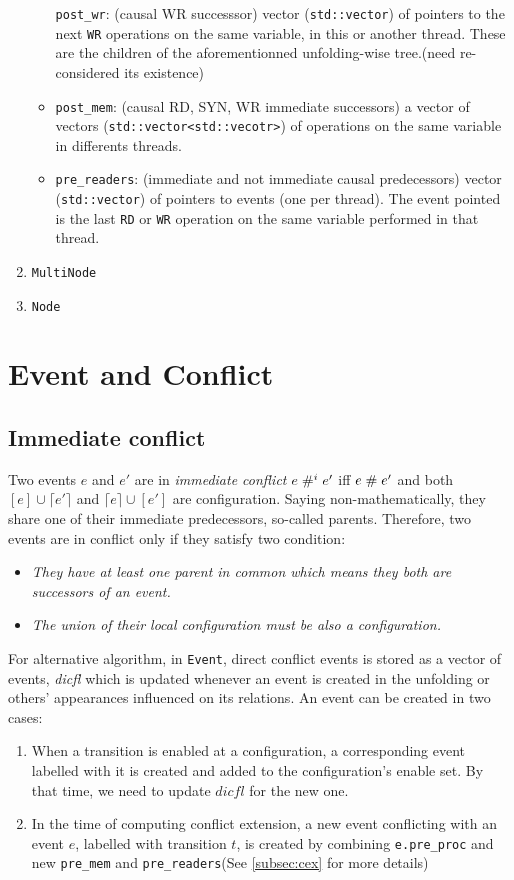 \documentclass{llncs}
\begin{document}
\begin{enumerate}
\begin{itemize}
  \verb!post_wr!: (causal WR successsor) vector (\verb!std::vector!) of
  pointers to the next \verb!WR! operations on the same variable, in this
  or another thread. These are the children of the aforementionned
  unfolding-wise tree.(need re-considered its existence)
\item
  \verb!post_mem!: (causal RD, SYN, WR immediate successors) a vector of vectors (\verb!std::vector<std::vecotr>!) of operations on the same variable in differents threads. 
	
\item
  \verb!pre_readers!: (immediate and not immediate causal predecessors)
  vector (\verb!std::vector!) of pointers to events (one per thread).
  The event pointed is the last \verb!RD! or \verb!WR! operation on the
  same variable performed in that thread.
\end{itemize}

\item
	\verb!MultiNode!
\item
	\verb!Node!

\end{enumerate}

\section{Event and Conflict}
\subsection{Immediate conflict}
Two events $e$ and $e'$ are in \textit{immediate conflict} $e \mathrel{\#^i_{}} e' $ iff $e \mathrel{\#} e'$ and both $[e] \cup \lceil e' \rceil$ and $ \lceil e \rceil \cup [e']$ are configuration. Saying non-mathematically, they share one of their immediate predecessors, so-called parents.
Therefore, two events are in conflict only if they satisfy two condition:
\begin{itemize}
\item
	\textit{They have at least one parent in common which means they both are successors of an event.}
\item
	\textit{The union of their local configuration must be also a configuration.}
\end{itemize}

For alternative algorithm, in \verb!Event!, direct conflict events is stored as a vector of events, \textit{dicfl} which is updated whenever an event is created in the unfolding or others' appearances influenced on its relations.
An event can be created in two cases:
\begin{enumerate}
\item
	When a transition is enabled at a configuration, a corresponding event labelled with it is
	created and added to the configuration's enable set. By that time, we need to update $dicfl$ for 
	the new one.
\item
	In the time of computing conflict extension, a new event conflicting with an event $e$, labelled
	with transition $t$, is created by combining \verb!e.pre_proc! and new \verb!pre_mem! and 
	\verb!pre_readers!(See \cref{subsec:cex} for more details)	
\end{enumerate}
\end{document}
